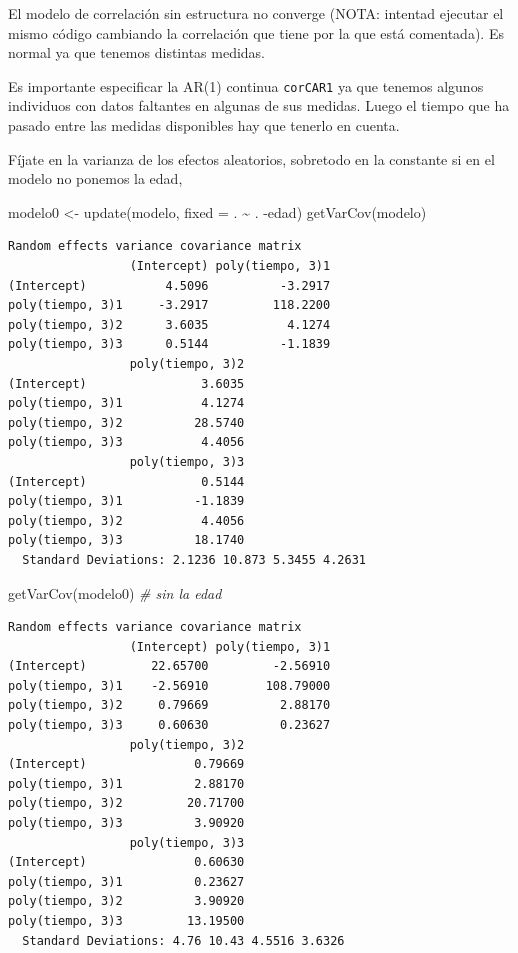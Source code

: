 \documentclass[
]{book}
\newenvironment{Shaded}{\begin{snugshade}}{\end{snugshade}}
\newcommand{\AttributeTok}[1]{\textcolor[rgb]{0.77,0.63,0.00}{#1}}
\newcommand{\CommentTok}[1]{\textcolor[rgb]{0.56,0.35,0.01}{\textit{#1}}}
\newcommand{\FunctionTok}[1]{\textcolor[rgb]{0.00,0.00,0.00}{#1}}
\newcommand{\NormalTok}[1]{#1}
\newcommand{\OtherTok}[1]{\textcolor[rgb]{0.56,0.35,0.01}{#1}}
\newcommand{\SpecialCharTok}[1]{\textcolor[rgb]{0.00,0.00,0.00}{#1}}
\begin{document}
El modelo de correlación sin estructura no converge (NOTA: intentad ejecutar el mismo código cambiando la correlación que tiene por la que está comentada). Es normal ya que tenemos distintas medidas.

Es importante especificar la AR(1) continua \texttt{corCAR1} ya que tenemos algunos individuos con datos faltantes en algunas de sus medidas. Luego el tiempo que ha pasado entre las medidas disponibles hay que tenerlo en cuenta.

Fíjate en la varianza de los efectos aleatorios, sobretodo en la constante si en el modelo no ponemos la edad,

\begin{Shaded}
\begin{Highlighting}[]
\NormalTok{modelo0 }\OtherTok{\textless{}{-}} \FunctionTok{update}\NormalTok{(modelo, }\AttributeTok{fixed =}\NormalTok{ . }\SpecialCharTok{\textasciitilde{}}\NormalTok{ . }\SpecialCharTok{{-}}\NormalTok{edad)}
\FunctionTok{getVarCov}\NormalTok{(modelo)}
\end{Highlighting}
\end{Shaded}

\begin{verbatim}
Random effects variance covariance matrix
                 (Intercept) poly(tiempo, 3)1
(Intercept)           4.5096          -3.2917
poly(tiempo, 3)1     -3.2917         118.2200
poly(tiempo, 3)2      3.6035           4.1274
poly(tiempo, 3)3      0.5144          -1.1839
                 poly(tiempo, 3)2
(Intercept)                3.6035
poly(tiempo, 3)1           4.1274
poly(tiempo, 3)2          28.5740
poly(tiempo, 3)3           4.4056
                 poly(tiempo, 3)3
(Intercept)                0.5144
poly(tiempo, 3)1          -1.1839
poly(tiempo, 3)2           4.4056
poly(tiempo, 3)3          18.1740
  Standard Deviations: 2.1236 10.873 5.3455 4.2631 
\end{verbatim}

\begin{Shaded}
\begin{Highlighting}[]
\FunctionTok{getVarCov}\NormalTok{(modelo0) }\CommentTok{\# sin la edad}
\end{Highlighting}
\end{Shaded}

\begin{verbatim}
Random effects variance covariance matrix
                 (Intercept) poly(tiempo, 3)1
(Intercept)         22.65700         -2.56910
poly(tiempo, 3)1    -2.56910        108.79000
poly(tiempo, 3)2     0.79669          2.88170
poly(tiempo, 3)3     0.60630          0.23627
                 poly(tiempo, 3)2
(Intercept)               0.79669
poly(tiempo, 3)1          2.88170
poly(tiempo, 3)2         20.71700
poly(tiempo, 3)3          3.90920
                 poly(tiempo, 3)3
(Intercept)               0.60630
poly(tiempo, 3)1          0.23627
poly(tiempo, 3)2          3.90920
poly(tiempo, 3)3         13.19500
  Standard Deviations: 4.76 10.43 4.5516 3.6326 
\end{verbatim}
\end{document}
